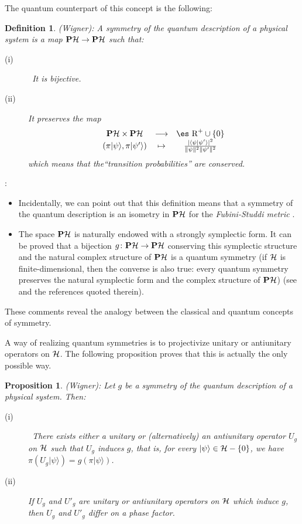 \documentclass[12pt]{article}
\theoremstyle{plain}
\newtheorem{prop}{Proposition}
\newtheorem{definition}{Definition}
\def\H{{\cal H}}
\def\sta{|\psi \rangle }
\def\Real{\mbox{\es R}}
\begin{document}
The quantum counterpart of this concept is the following:

\begin{definition}
{\rm (Wigner):}
A {\rm symmetry} of the quantum description of a physical system is a
map
${\bf P}\H \to {\bf P}\H$ such that:
\begin{description}
\item[{\rm (i)}] \
It is  bijective.
\item[{\rm (ii)}]
It preserves the map
$$
\begin{array}{ccc}
{\bf P}\H \times {\bf P}\H & \longrightarrow & \Real^+ \cup \{ 0 \}
\\
(\pi \sta , \pi |\psi '\rangle ) & \mapsto &
\frac{\mid \langle \psi | \psi '\rangle \mid^2}
{\| \psi \|^2 \| \psi '\|^2}
\end{array}
$$
which means that the``transition probabilities'' are conserved.
\end{description}
\label{qsym}
\end{definition}
%
\goodbreak
{}:
\begin{itemize}
\item
Incidentally, we can point out that
this definition means that a symmetry of the quantum description
is an isometry in ${\bf P}\H$ for the {\it Fubini-Studdi metric}
\cite{Wl-85}.
\item
The space ${\bf P}\H$ is naturally endowed with a strongly symplectic
form.
It can be proved that a bijection $g \colon {\bf P}\H \to {\bf P}\H$
conserving this symplectic structure and the natural complex
structure of ${\bf P}\H$ is a quantum symmetry
(if $\H$ is finite-dimensional, then the converse is also true:
every quantum symmetry preserves the natural symplectic form
and the complex structure of ${\bf P}\H$)
(see \cite{Tu-87} and the references quoted therein).
\end{itemize}

These comments reveal the analogy between the classical and
quantum concepts of symmetry.

A way of realizing quantum symmetries
is to projectivize unitary or antiunitary operators on $\H$.
The following proposition proves that this is actually the only possible
way.

\begin{prop}
{\rm (Wigner):}
Let $g$ be a symmetry of the quantum description of a physical system.
Then:
\begin{description}
\item[{\rm (i)}] \
There exists either a unitary or (alternatively) an antiunitary
operator $U_g$ on $\H$ such that $U_g$ induces $g$, that is, for
every $\sta \in \H -\{ 0 \}$, we have $\pi(U_g\sta ) = g(\pi \sta
)$.
\item[{\rm (ii)}]
If $U_g$ and $U'_g$ are unitary or antiunitary operators
on $\H$ which induce $g$, then $U_g$ and $U'_g$ differ on a phase
factor.
\end{description}
\label{sg}
\end{prop}
\end{document}
